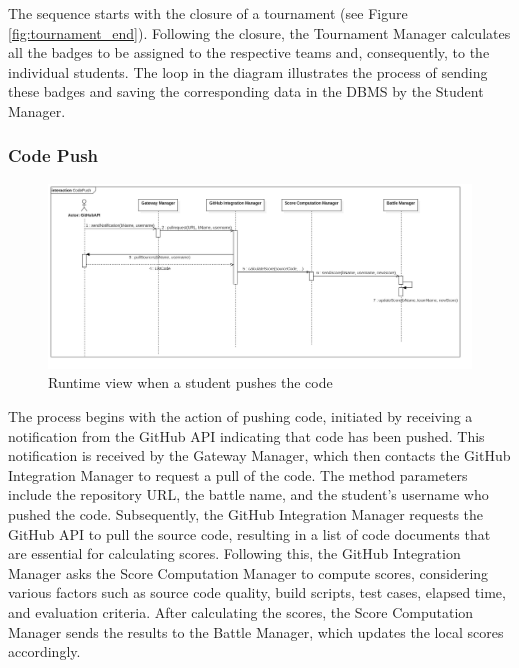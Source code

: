 The sequence starts with the closure of a tournament (see Figure \ref{fig:tournament_end}). Following the closure, the Tournament Manager calculates all the badges to be assigned to the respective teams and, consequently, to the individual students. The loop in the diagram illustrates the process of sending these badges and saving the corresponding data in the DBMS by the Student Manager.

\newpage

\subsubsection*{Code Push}
\begin{figure}[h!]
    \centering
    \includegraphics[width=1.3\linewidth, angle=90]{2.ArchitecturalDesign/res/CodePush.jpg}
    \caption{Runtime view when a student pushes the code}
    \label{fig:push}
\end{figure}

The process begins with the action of pushing code, initiated by receiving a notification from the GitHub API indicating that code has been pushed. This notification is received by the Gateway Manager, which then contacts the GitHub Integration Manager to request a pull of the code. The method parameters include the repository URL, the battle name, and the student's username who pushed the code.
Subsequently, the GitHub Integration Manager requests the GitHub API to pull the source code, resulting in a list of code documents that are essential for calculating scores. Following this, the GitHub Integration Manager asks the Score Computation Manager to compute scores, considering various factors such as source code quality, build scripts, test cases, elapsed time, and evaluation criteria.
After calculating the scores, the Score Computation Manager sends the results to the Battle Manager, which updates the local scores accordingly.

\newpage

